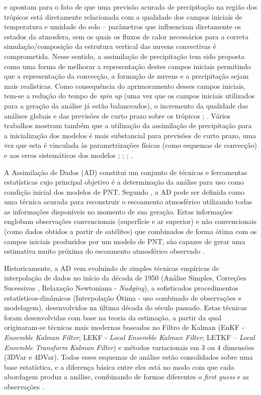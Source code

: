  e  apontam para o fato de que uma previsão acurada de precipitação na região dos trópicos está diretamente relacionada com a qualidade dos campos iniciais de temperatura e umidade do solo – parâmetros que influenciam diretamente os estados da atmosfera, sem os quais os fluxos de calor necessários para a correta simulação/composição da estrutura vertical das nuvens convectivas é comprometida. Nesse sentido, a assimilação de precipitação tem sido proposta como uma forma de melhorar a representação destes campos iniciais permitindo que a representação da convecção, a formação de nuvens e a precipitação sejam mais realísticas. Como consequência do aprimoramento desses campos iniciais, tem-se a redução do tempo de \textit{spin up} (uma vez que os campos iniciais utilizados para a geração da análise já estão balanceados), o incremento da qualidade das análises globais e das previsões de curto prazo sobre os trópicos \cite{heckleyetal90}; \cite{falkovichetal00}. Vários trabalhos mostram também que a utilização da assimilação de precipitação para a inicialização dos modelos é mais substancial para previsões de curto prazo, uma vez que esta é vinculada às parametrizações físicas (como esquemas de convecção) e aos erros sistemáticos dos modelos \cite{kasaharaetal94}; \cite{mathur95}; \cite{zupanskimesinger95}; \cite{nunescocke04}.

A Assimilação de Dados (AD) constitui um conjunto de técnicas e ferramentas estatísticas cujo principal objetivo é a determinação da análise para uso como condição inicial dos modelos de PNT. Segundo , a AD pode ser definida como uma técnica acurada para reconstruir o escoamento atmosférico utilizando todas as informações disponíveis no momento de sua geração. Estas informações englobam observações convencionais (superfície e ar superior) e não convencionais (como dados obtidos a partir de satélites) que combinados de forma ótima com os campos iniciais produzidos por um modelo de PNT, são capazes de gerar uma estimativa muito próxima do escoamento atmosférico observado \cite{kalnay03}.

Historicamente, a AD vem evoluindo de simples técnicas empíricas de interpolação de dados no início da década de 1950 (Análise Simples, Correções Sucessivas \cite{cressman59}, Relaxação Newtoniana - \textit{Nudging}), a sofisticados procedimentos estatísticos-dinâmicos (Interpolação Ótima - uso combinado de observações e modelagem), desenvolvidos na última década do século passado. Estas técnicas foram desenvolvidas com base na teoria da estimação, a partir da qual originaram-se técnicas mais modernas baseadas no Filtro de Kalman (EnKF - \textit{Ensemble Kalman Filter}; LEKF - \textit{Local Ensemble Kalman Filter}; LETKF – \textit{Local Ensemble Transform Kalman Filter}) e métodos variacionais em 3 ou 4 dimensões (3DVar e 4DVar). Todos esses esquemas de análise estão consolidados sobre uma base estatística, e a diferença básica entre eles está no modo com que cada abordagem produz a análise, combinando de formas diferentes o \textit{first guess} e as observações \cite{kalnay03}.

